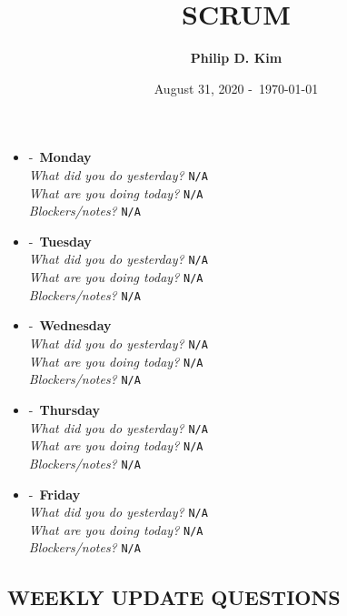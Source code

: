 \documentclass{article}
\title{\Huge\textbf{SCRUM}}
\author{\textbf{Philip D. Kim}}
\date{August 31, 2020 -\ \today}
\begin{document}
  \maketitle
  \begin{itemize}
    \item[\textbf{08/31}] -\ \textbf{Monday} \\ \textsl{What did you do yesterday?} \texttt{N/A} \\ \textsl{What are you doing today?} \texttt{N/A} \\ \textsl{Blockers/notes?} \texttt{N/A}
    \item[\textbf{09/01}] -\ \textbf{Tuesday} \\ \textsl{What did you do yesterday?} \texttt{N/A} \\ \textsl{What are you doing today?} \texttt{N/A} \\ \textsl{Blockers/notes?} \texttt{N/A}
    \item[\textbf{09/02}] -\ \textbf{Wednesday} \\ \textsl{What did you do yesterday?} \texttt{N/A} \\ \textsl{What are you doing today?} \texttt{N/A} \\ \textsl{Blockers/notes?} \texttt{N/A}
    \item[\textbf{09/03}] -\ \textbf{Thursday} \\ \textsl{What did you do yesterday?} \texttt{N/A} \\ \textsl{What are you doing today?} \texttt{N/A} \\ \textsl{Blockers/notes?} \texttt{N/A}
    \item[\textbf{09/04}] -\ \textbf{Friday} \\ \textsl{What did you do yesterday?} \texttt{N/A} \\ \textsl{What are you doing today?} \texttt{N/A} \\ \textsl{Blockers/notes?} \texttt{N/A}
  \end{itemize}
\clearpage
\begin{center}
  \section*{\Huge\textbf{WEEKLY UPDATE QUESTIONS}}
\end{center}
\end{document}
